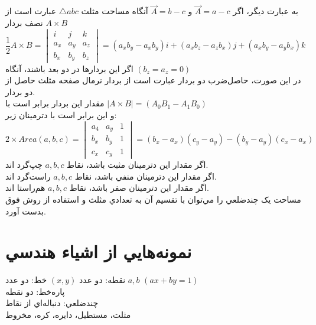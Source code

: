 \documentclass{book}
\begin{document}
       به عبارت ديگر، اگر
       $\vec{A}= a - c$
       و
              $\vec{A}= b - c$
        آنگاه مساحت مثلث 
          $\triangle abc$ 
         عبارت است از نصف بردار
      $A\times B$
      \\
      \[
      \frac{1}{2}A \times B = \begin{vmatrix}
      i	& j & k \\
      a_{x} & a_{y} & a_{z}\\
      b_{x} & b_{y} & b_{z}
      \end{vmatrix} = (a_{x}b_{y} - a_{x}b_{y})i + (a_{x}b_{z} - a_{z}b_{x})j + (a_{x}b_{y} - a_{y}b_{x})k
      \]
      اگر اين بردارها در دو بعد باشند، آنگاه 
      $(b_{z}=a_{z}=0)$ 
      \\
      
      در اين صورت، حاصل‌ضرب دو بردار عبارت است از بردار نرمال صفحه مثلث حاصل از دو بردار.\\
      مقدار اين بردار برابر است با      
      $|A\times B|= (A_{0}B_{1} - A_{1}B_{0})$
      \\
      و اين برابر است با دترمينان زير:
      \[
      2 \times Area(a,b,c) = \begin{vmatrix}
      a_{4} & a_{y} & 1 \\
      b_{x} & b_{y} & 1 \\
      c_{x} & c_{y} & 1
      \end{vmatrix} = (b_{x} - a_{x})(c_{y} - a_{y}) - (b_{y} - a_{y})(c_{x} - a_{x})
      \]
      اگر مقدار اين دترمينان مثبت باشد، نقاط $a,b,c$ چپ‌گرد اند.\\
      اگر مقدار اين دترمينان منفي باشد، نقاط $a,b,c$ راست‌گرد اند.\\
      اگر مقدار اين دترمينان صفر باشد، نقاط $a,b,c$ هم‌راستا اند.\\
      مساحت يک چندضلعي را مي‌توان با تقسيم آن به تعدادي مثلث و استفاده از روش فوق بدست آورد.
      \section*{نمونه‌هايي از اشياء هندسي} 	
      نقطه: دو عدد $(x,y)$
      خط: دو عدد $a,b$
      $(ax + by = 1)$
      \\
      پاره‌خط: دو نقطه\\
      چندضلعي: دنباله‌اي از نقاط\\
      مثلث، مستطيل، دايره، کره، مخروط\\
\end{document}
